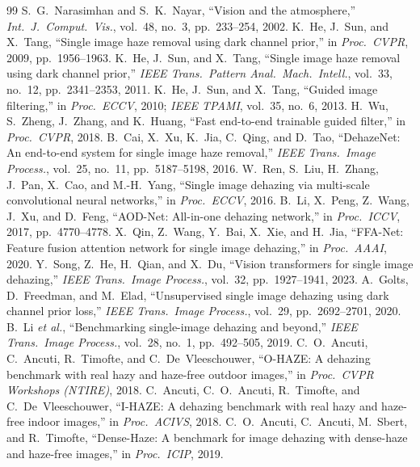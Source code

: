 \documentclass[conference]{IEEEtran}
\begin{document}
\begin{thebibliography}{99}
 S.~G.~Narasimhan and S.~K.~Nayar, ``Vision and the atmosphere,'' \emph{Int.\ J.\ Comput.\ Vis.}, vol.~48, no.~3, pp.~233--254, 2002.
 K.~He, J.~Sun, and X.~Tang, ``Single image haze removal using dark channel prior,'' in \emph{Proc.\ CVPR}, 2009, pp.~1956--1963.
 K.~He, J.~Sun, and X.~Tang, ``Single image haze removal using dark channel prior,'' \emph{IEEE Trans.\ Pattern Anal.\ Mach.\ Intell.}, vol.~33, no.~12, pp.~2341--2353, 2011.
 K.~He, J.~Sun, and X.~Tang, ``Guided image filtering,'' in \emph{Proc.\ ECCV}, 2010; \emph{IEEE TPAMI}, vol.~35, no.~6, 2013.
 H.~Wu, S.~Zheng, J.~Zhang, and K.~Huang, ``Fast end-to-end trainable guided filter,'' in \emph{Proc.\ CVPR}, 2018.
 B.~Cai, X.~Xu, K.~Jia, C.~Qing, and D.~Tao, ``DehazeNet: An end-to-end system for single image haze removal,'' \emph{IEEE Trans.\ Image Process.}, vol.~25, no.~11, pp.~5187--5198, 2016.
 W.~Ren, S.~Liu, H.~Zhang, J.~Pan, X.~Cao, and M.-H.~Yang, ``Single image dehazing via multi-scale convolutional neural networks,'' in \emph{Proc.\ ECCV}, 2016.
 B.~Li, X.~Peng, Z.~Wang, J.~Xu, and D.~Feng, ``AOD-Net: All-in-one dehazing network,'' in \emph{Proc.\ ICCV}, 2017, pp.~4770--4778.
 X.~Qin, Z.~Wang, Y.~Bai, X.~Xie, and H.~Jia, ``FFA-Net: Feature fusion attention network for single image dehazing,'' in \emph{Proc.\ AAAI}, 2020.
 Y.~Song, Z.~He, H.~Qian, and X.~Du, ``Vision transformers for single image dehazing,'' \emph{IEEE Trans.\ Image Process.}, vol.~32, pp.~1927--1941, 2023.
 A.~Golts, D.~Freedman, and M.~Elad, ``Unsupervised single image dehazing using dark channel prior loss,'' \emph{IEEE Trans.\ Image Process.}, vol.~29, pp.~2692--2701, 2020.
 B.~Li \emph{et al.}, ``Benchmarking single-image dehazing and beyond,'' \emph{IEEE Trans.\ Image Process.}, vol.~28, no.~1, pp.~492--505, 2019.
 C.~O.~Ancuti, C.~Ancuti, R.~Timofte, and C.~De~Vleeschouwer, ``O-HAZE: A dehazing benchmark with real hazy and haze-free outdoor images,'' in \emph{Proc.\ CVPR Workshops (NTIRE)}, 2018.
 C.~Ancuti, C.~O.~Ancuti, R.~Timofte, and C.~De~Vleeschouwer, ``I-HAZE: A dehazing benchmark with real hazy and haze-free indoor images,'' in \emph{Proc.\ ACIVS}, 2018.
 C.~O.~Ancuti, C.~Ancuti, M.~Sbert, and R.~Timofte, ``Dense-Haze: A benchmark for image dehazing with dense-haze and haze-free images,'' in \emph{Proc.\ ICIP}, 2019.

\end{thebibliography}
\end{document}
